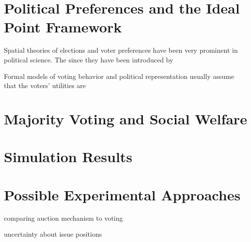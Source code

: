 \documentclass[12pt]{article}
\begin{document}
\section{Political Preferences and the Ideal Point Framework}

Spatial theories of elections and voter preferences have been very prominent in political science. The  since they have been introduced by \citet{downs1957economic}

Formal models of voting behavior and political representation usually assume that the voters' utilities are

\section{Majority Voting and Social Welfare}

\citet{hastie2005robust}



\section{Simulation Results}




\section{Possible Experimental Approaches}

\citet{oprea2007compensation}

comparing auction mechanism to voting

uncertainty about issue positions




\clearpage



\end{document}
